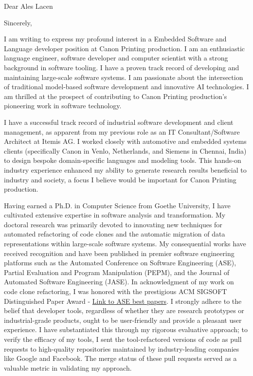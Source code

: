 \documentclass[12pt,a4paper,sans]{moderncv}
\begin{document}
\date{\today}
\opening{Dear Ales Lacen}
\closing{Sincerely,}

\makelettertitle

I am writing to express my profound interest in a Embedded Software and Language developer position at Canon Printing production. I am an enthusiastic language engineer, software developer and computer scientist with a strong background in software tooling. I have a proven track record of developing and maintaining large-scale software systems. I am passionate about the intersection of traditional model-based software development and innovative AI technologies. I am thrilled at the prospect of contributing to Canon Printing production's pioneering work in software technology.

I have a successful track record of industrial software development and client management, as apparent from my previous role as an IT Consultant/Software Architect at Itemis AG. I worked closely with automotive and embedded systems clients (specifically Canon in Venlo, Netherlands, and Siemens in Chennai, India) to design bespoke domain-specific languages and modeling tools. This hands-on industry experience enhanced my ability to generate research results beneficial to industry and society, a focus I believe would be important for Canon Printing production.

Having earned a Ph.D. in Computer Science from Goethe University, I have cultivated extensive expertise in software analysis and transformation. My doctoral research was primarily devoted to innovating new techniques for automated refactoring of code clones and the automatic migration of data representations within large-scale software systems. My consequential works have received recognition and have been published in premier software engineering platforms such as the Automated Conference on Software Engineering (ASE), Partial Evaluation and Program Manipulation (PEPM), and the Journal of Automated Software Engineering (JASE). In acknowledgment of my work on code clone refactoring, I was honored with the prestigious ACM SIGSOFT Distinguished Paper Award - \href{https://ase-conferences.org/olbib/}{Link to ASE best papers}. I strongly adhere to the belief that developer tools, regardless of whether they are research prototypes or industrial-grade products, ought to be user-friendly and provide a pleasant user experience. I have substantiated this through my rigorous evaluative approach; to verify the efficacy of my tools, I sent the tool-refactored versions of code as pull requests to high-quality repositories maintained by industry-leading companies like Google and Facebook. The merge status of these pull requests served as a valuable metric in validating my approach.
\end{document}
